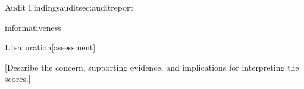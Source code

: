 \begin{maincontentstyled}
\begin{reportpart}{Audit Findings}{audit}{sec:auditreport}
\begin{dimensionreview}{informativeness}
\observedevidence
\begin{concernevidence}{I.1}{saturation}{[assessment]}
\begin{cnotes}
  \item {[Describe the concern, supporting evidence, and implications for interpreting the scores.]}
\end{cnotes}
\end{concernevidence}
\end{dimensionreview}

\end{reportpart}



\auditpartsend

\end{maincontentstyled}
